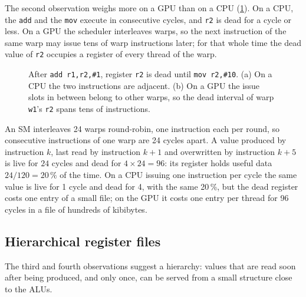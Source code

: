 \documentclass[../main.tex]{subfiles}
\begin{document}
The second observation weighs more on a GPU than on a CPU
(\cref{fig:l06-live-dead}).  On a CPU, the \texttt{add} and the
\texttt{mov} execute in consecutive cycles, and \texttt{r2} is dead for
a cycle or less.  On a GPU the scheduler interleaves warps, so the next
instruction of the same warp may issue tens of warp instructions later;
for that whole time the dead value of \texttt{r2} occupies a register
of every thread of the warp.

\begin{figure}[tb]
  \centering
  
  \caption{After \texttt{add r1,r2,\#1}, register \texttt{r2} is dead
    until \texttt{mov r2,\#10}.  (a) On a CPU the two instructions are
    adjacent.  (b) On a GPU the issue slots in between belong to other
    warps, so the dead interval of warp \texttt{w1}'s \texttt{r2}
    spans tens of instructions.}
  \label{fig:l06-live-dead}
\end{figure}


\begin{example}
  \label{ex:l06-live-dead}
  An SM interleaves 24 warps round-robin, one instruction each per round,
  so consecutive instructions of one warp are 24 cycles apart.  A value
  produced by instruction $k$, last read by instruction $k+1$ and
  overwritten by instruction $k+5$ is live for $24$ cycles and dead for
  $4 \times 24 = 96$: its register holds useful data
  $24/120 = 20\,\%$ of the time.  On a CPU issuing one instruction per
  cycle the same value is live for 1 cycle and dead for 4, with the same
  20\,\%, but the dead register costs one entry of a small file; on the
  GPU it costs one entry per thread for 96 cycles in a file of hundreds
  of kibibytes.
\end{example}

\subsection{Hierarchical register files}

The third and fourth observations suggest a hierarchy: values that are
read soon after being produced, and only once, can be served from a
small structure close to the ALUs.
\end{document}
